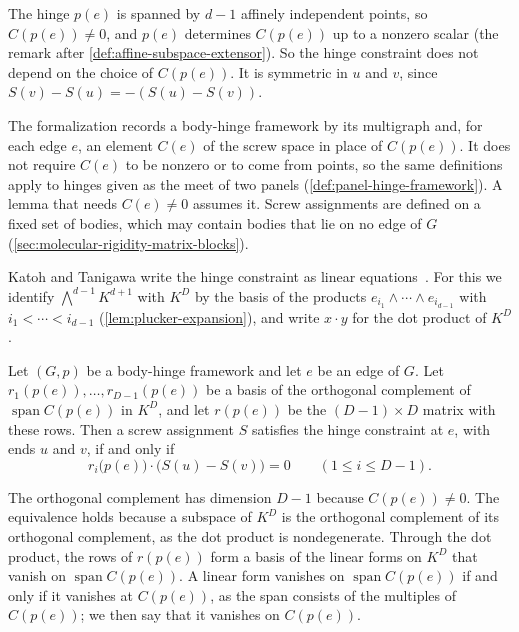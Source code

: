 The hinge $p(e)$ is spanned by $d - 1$ affinely independent points, so
$C(p(e)) \neq 0$, and $p(e)$ determines $C(p(e))$ up to a nonzero
scalar (the remark after \cref{def:affine-subspace-extensor}). So the
hinge constraint does not depend on the choice of $C(p(e))$. It is
symmetric in $u$ and $v$, since $S(v) - S(u) = -(S(u) - S(v))$.

\begin{fmlnote}
  The formalization records a body-hinge framework by its multigraph
  and, for each edge $e$, an element $C(e)$ of the screw space in place
  of $C(p(e))$. It does not require $C(e)$ to be nonzero or to come from
  points, so the same definitions apply to hinges given as the meet of
  two panels (\cref{def:panel-hinge-framework}). A lemma that needs
  $C(e) \neq 0$ assumes it. Screw assignments are defined on a fixed set
  of bodies, which may contain bodies that lie on no edge of $G$
  (\cref{sec:molecular-rigidity-matrix-blocks}).
\end{fmlnote}

Katoh and Tanigawa write the hinge constraint as linear
equations~\cite[\S2.4]{katohTanigawa2011}. For this we identify
$\bigwedge^{d-1}K^{d+1}$ with $K^D$ by the basis of the products
$e_{i_1} \wedge \cdots \wedge e_{i_{d-1}}$ with
$i_1 < \cdots < i_{d-1}$ (\cref{lem:plucker-expansion}),
and write $x \cdot y$ for the dot product of $K^D$.

\begin{definition}
  \label{def:hinge-row-block}
  \leanok
  Let $(G,p)$ be a body-hinge framework and let $e$ be an edge of $G$.
  Let $r_1(p(e)), \dots, r_{D-1}(p(e))$ be a basis of the orthogonal
  complement of $\operatorname{span} C(p(e))$ in $K^D$, and let
  $r(p(e))$ be the $(D-1) \times D$ matrix with these rows. Then a screw
  assignment $S$ satisfies the hinge constraint at $e$, with ends $u$
  and $v$, if and only if
  \[
    r_i\bigl(p(e)\bigr) \cdot \bigl(S(u) - S(v)\bigr) = 0
    \qquad (1 \le i \le D-1).
  \]
\end{definition}

The orthogonal complement has dimension $D - 1$ because
$C(p(e)) \neq 0$. The equivalence holds because a subspace of $K^D$ is
the orthogonal complement of its orthogonal complement, as the dot
product is nondegenerate. Through the dot product, the rows of
$r(p(e))$ form a basis of the linear forms on $K^D$ that vanish on
$\operatorname{span} C(p(e))$. A linear form vanishes on
$\operatorname{span} C(p(e))$ if and only if it vanishes at $C(p(e))$,
as the span consists of the multiples of $C(p(e))$; we then say that it
vanishes on $C(p(e))$.


